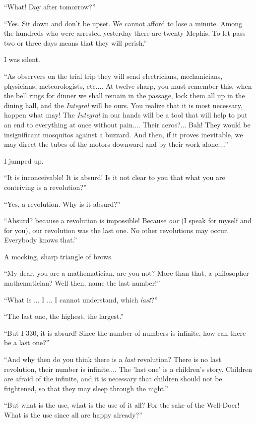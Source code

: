 \documentclass[11pt,openany]{book}
\begin{document}
``What! Day after tomorrow?''

``Yes. Sit down and don't be upset. We cannot afford to lose a minute. Among the hundreds who were arrested yesterday there are twenty Mephis. To let pass two or three days means that they will perish.''

I was silent.

``As observers on the trial trip they will send electricians, mechanicians, physicians, meteorologists, etc.... At twelve sharp, you must remember this, when the bell rings for dinner we shall remain in the passage, lock them all up in the dining hall, and the \emph{Integral} will be ours. You realize that it is most necessary, happen what may! The \emph{Integral} in our hands will be a tool that will help to put an end to everything at once without pain.... Their aeros?... Bah! They would be insignificant mosquitos against a buzzard. And then, if it proves inevitable, we may direct the tubes of the motors downward and by their work alone....''

I jumped up.

``It is inconceivable! It is absurd! Is it not clear to you that what you are contriving is a revolution?''

``Yes, a revolution. Why is it absurd?''

``Absurd? because a revolution is impossible! Because \emph{our} (I speak for myself and for you), our revolution was the last one. No other revolutions may occur. Everybody knows that.''

A mocking, sharp triangle of brows.

``My dear, you are a mathematician, are you not? More than that, a philosopher-mathematician? Well then, name the last number!''

``What is ... I ... I cannot understand, which \emph{last}?''

``The last one, the highest, the largest.''

``But I-330, it is absurd! Since the number of numbers is infinite, how can there be a last one?''

``And why then do you think there is a \emph{last} revolution? There is no last revolution, their number is infinite.... The 'last one' is a children's story. Children are afraid of the infinite, and it is necessary that children should not be frightened, so that they may sleep through the night.''

``But what is the use, what is the use of it all? For the sake of the Well-Doer! What is the use since all are happy already?''
\end{document}
